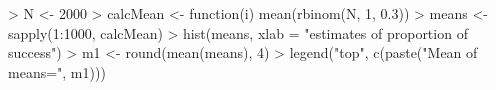 \begin{Schunk}
\begin{Sinput}
> N <- 2000
> calcMean <- function(i) mean(rbinom(N, 1, 0.3))
> means <- sapply(1:1000, calcMean)
> hist(means, xlab = "estimates of proportion of success")
> m1 <- round(mean(means), 4)
> legend("top", c(paste("Mean of means=", m1)))
\end{Sinput}
\end{Schunk}
